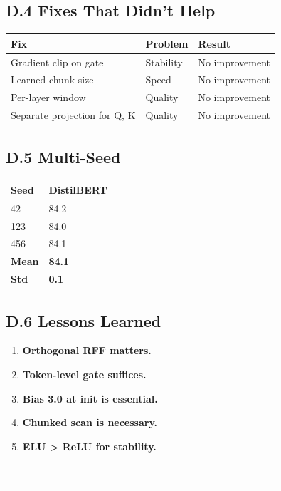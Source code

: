 \subsection{D.4 Fixes That Didn't Help}

\begin{table}[H]
\centering
\small
\begin{tabular}{lll}
\toprule
\textbf{Fix} & \textbf{Problem} & \textbf{Result} \\
\midrule
Gradient clip on gate & Stability & No improvement \\
Learned chunk size & Speed & No improvement \\
Per-layer window & Quality & No improvement \\
Separate projection for Q, K & Quality & No improvement \\
\bottomrule
\end{tabular}
\end{table}

\subsection{D.5 Multi-Seed}

\begin{table}[H]
\centering
\small
\begin{tabular}{ll}
\toprule
\textbf{Seed} & \textbf{DistilBERT} \\
\midrule
42 & 84.2 \\
123 & 84.0 \\
456 & 84.1 \\
\textbf{Mean} & \textbf{84.1} \\
\textbf{Std} & \textbf{0.1} \\
\bottomrule
\end{tabular}
\end{table}

\subsection{D.6 Lessons Learned}

\begin{enumerate}
\item \textbf{Orthogonal RFF matters.}
\item \textbf{Token-level gate suffices.}
\item \textbf{Bias 3.0 at init is essential.}
\item \textbf{Chunked scan is necessary.}
\item \textbf{ELU > ReLU for stability.}
\end{enumerate}
\begin{lstlisting}

---
\end{lstlisting}